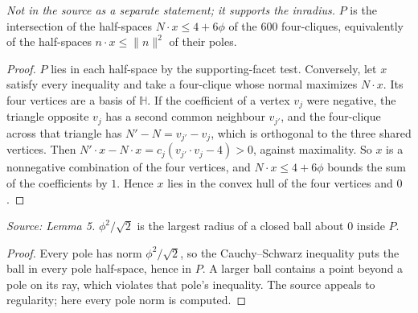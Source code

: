 \begin{theorem}
  \label{thm:half-spaces}
  \leanok
  \textit{Not in the source as a separate statement; it supports the
  inradius.}
  \(P\) is the intersection of the half-spaces \(N\cdot x\le4+6\phi\) of
  the \(600\) four-cliques, equivalently of the half-spaces
  \(n\cdot x\le\|n\|^2\) of their poles.
\end{theorem}
\begin{proof}
  \leanok
  \(P\) lies in each half-space by the supporting-facet test. Conversely,
  let \(x\) satisfy every inequality and take a four-clique whose normal
  maximizes \(N\cdot x\). Its four vertices are a basis of \(\mathbb H\).
  If the coefficient of a vertex \(v_j\) were negative, the triangle
  opposite \(v_j\) has a second common neighbour \(v_{j'}\), and the
  four-clique across that triangle has \(N'-N=v_{j'}-v_j\), which is
  orthogonal to the three shared vertices. Then
  \(N'\cdot x-N\cdot x=c_j(v_{j'}\cdot v_j-4)>0\), against maximality. So
  \(x\) is a nonnegative combination of the four vertices, and
  \(N\cdot x\le4+6\phi\) bounds the sum of the coefficients by \(1\). Hence
  \(x\) lies in the convex hull of the four vertices and \(0\).
\end{proof}

\begin{theorem}[Inradius]
  \label{thm:inradius}
  \leanok
  \textit{Source: Lemma 5.}
  \(\phi^2/\sqrt2\) is the largest radius of a closed ball about \(0\)
  inside \(P\).
\end{theorem}
\begin{proof}
  \leanok
  Every pole has norm \(\phi^2/\sqrt2\), so the Cauchy--Schwarz inequality
  puts the ball in every pole half-space, hence in \(P\). A larger ball
  contains a point beyond a pole on its ray, which violates that pole's
  inequality. The source appeals to regularity; here every pole norm is
  computed.
\end{proof}

